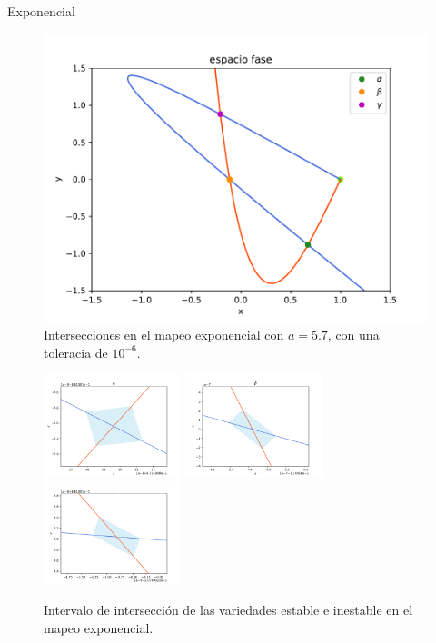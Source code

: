 \documentclass[11pt]{beamer}
\theoremstyle{definition}
\begin{document}
\begin{frame}{Exponencial}
\begin{figure}[H]
\centering
\includegraphics[scale=0.5]{cruces_jung1}
\caption{Intersecciones en el mapeo exponencial con $a=5.7$, con una toleracia de $10^{-6}$.}
\label{jung_cortes}
\end{figure}
\end{frame}

\begin{frame}
\begin{figure}
\includegraphics[width=40mm]{cruce_a}
\includegraphics[width=40mm]{cruce_b}
\includegraphics[width=40mm]{cruce_c}
\caption{Intervalo de intersección de las variedades estable e inestable en el mapeo exponencial.} 
\label{cruces_jung}
\end{figure}
\end{frame}
\end{document}
